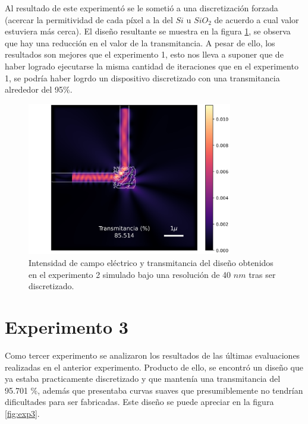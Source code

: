 Al resultado de este experimentó se le sometió a una discretización forzada (acercar la permitividad de cada píxel a la del $Si$ u $SiO_2$ de acuerdo a cual valor estuviera más cerca).
El diseño resultante se muestra en la figura \ref{fig:exp2-field-disc}, se observa que hay una reducción en el valor de la transmitancia.
A pesar de ello, los resultados son mejores que el experimento 1, esto nos lleva a suponer que de haber logrado ejecutarse la misma cantidad de iteraciones que en el experimento 1, se podría haber logrdo un dispositivo discretizado con una transmitancia alrededor del 95\%.

\begin{figure}
  \centering
  \includegraphics[width=0.80\textwidth]{image/results/device-v2-r40-disc.png}
  \caption{Intensidad de campo eléctrico y transmitancia del diseño obtenidos en el experimento 2 simulado bajo una resolución de 40 $nm$ tras ser discretizado.}
  \label{fig:exp2-field-disc}
\end{figure}


\section{Experimento 3}

Como tercer experimento se analizaron los resultados de las últimas evaluaciones realizadas en el anterior experimento.
Producto de ello, se encontró un diseño que ya estaba practicamente discretizado y que mantenía una transmitancia del 95.701 \%, además que presentaba curvas suaves que presumiblemente no tendrían dificultades para ser fabricadas. Este diseño se puede apreciar en la figura \ref{fig:exp3}.

